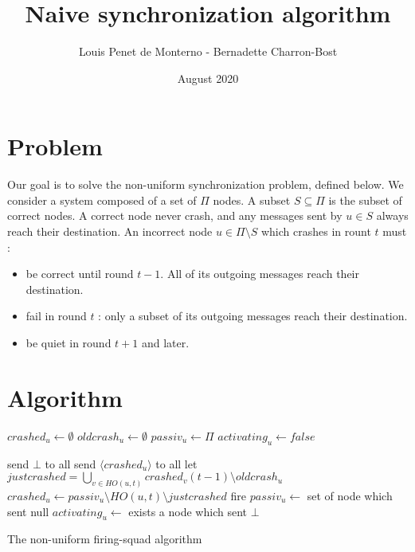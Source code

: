 \documentclass{article}
\title{Naive synchronization algorithm}
\date{August 2020}
\author{Louis Penet de Monterno - Bernadette Charron-Bost}
\begin{document}
\maketitle

\section{Problem}

Our goal is to solve the non-uniform synchronization problem, defined below.
We consider a system composed of a set of $\Pi$ nodes.
A subset $S \subseteq \Pi$ is the subset of correct nodes.
A correct node never crash, and any messages sent by $u \in S$ always reach their destination.
An incorrect node $u \in \Pi \setminus S$ which crashes in rount $t$ must :
\begin{itemize}
	\item be correct until round $t-1$. All of its outgoing messages reach their destination.
	\item fail in round $t$ : only a subset of its outgoing messages reach their destination.
	\item be quiet in round $t+1$ and later.
\end{itemize}

\section{Algorithm}

\begin{algorithm}[htb]\label{algo:code}
\begin{distribalgo}[1]
\BLANK {}
	\STATE $crashed_u \leftarrow \emptyset$
	\STATE $oldcrash_u \leftarrow \emptyset$
	\STATE $passiv_u \leftarrow \Pi$
	\STATE $activating_u \leftarrow false$

\ENDINDENT \BLANK

			\STATE send $\bot$ to all
		\ELSE
			\STATE send $\langle crashed_u \rangle$ to all
		\ENDIF
	\ENDINDENT \BLANK
		\STATE let $justcrashed = \bigcup\limits_{v \in HO(u,t)} crashed_v(t-1) \setminus oldcrash_u$  \label{line:detected-before}
		\STATE $crashed_u \leftarrow passiv_u \setminus HO(u, t) \setminus justcrashed$ \label{line:detect}
			\STATE fire 
		\ENDIF
		\STATE $passiv_u \leftarrow $ set of node which sent null
		\STATE $activating_u \leftarrow $ exists a node which sent $\bot$
	\ENDINDENT 
\ENDINDENT 

\caption{The non-uniform firing-squad algorithm} \label{algo:R}
\end{distribalgo}

\end{algorithm}
\end{document}
